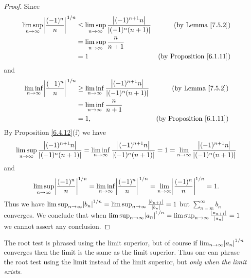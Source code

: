 \begin{proof}
    Since
    \begin{align*}
        \limsup_{n \to \infty} \abs{\frac{(-1)^n}{n}}^{1 / n} & \leq \limsup_{n \to \infty} \frac{\abs{(-1)^{n + 1} n}}{\abs{(-1)^n (n + 1)}} & \text{(by Lemma \ref{7.5.2})}        \\
                                                              & = \limsup_{n \to \infty} \frac{n}{n + 1}                                                                             \\
                                                              & = 1                                                                           & \text{(by Proposition \ref{6.1.11})}
    \end{align*}
    and
    \begin{align*}
        \liminf_{n \to \infty} \abs{\frac{(-1)^n}{n}}^{1 / n} & \geq \liminf_{n \to \infty} \frac{\abs{(-1)^{n + 1} n}}{\abs{(-1)^n (n + 1)}} & \text{(by Lemma \ref{7.5.2})}        \\
                                                              & = \liminf_{n \to \infty} \frac{n}{n + 1}                                                                             \\
                                                              & = 1,                                                                          & \text{(by Proposition \ref{6.1.11})}
    \end{align*}
    By Proposition \ref{6.4.12}(f) we have
    \[
        \limsup_{n \to \infty} \frac{\left\lvert(-1)^{n + 1} n\right\rvert}{\left\lvert(-1)^n (n + 1)\right\rvert} = \liminf_{n \to \infty} \frac{\left\lvert(-1)^{n + 1} n\right\rvert}{\left\lvert(-1)^n (n + 1)\right\rvert} = 1 = \lim_{n \to \infty} \frac{\left\lvert(-1)^{n + 1} n\right\rvert}{\left\lvert(-1)^n (n + 1)\right\rvert}
    \]
    and
    \[
        \limsup_{n \to \infty} \abs{\frac{(-1)^n}{n}}^{1 / n} = \liminf_{n \to \infty} \abs{\frac{(-1)^n}{n}}^{1 / n} = \lim_{n \to \infty} \abs{\frac{(-1)^n}{n}}^{1 / n} = 1.
    \]
    Thus we have \(\limsup_{n \to \infty} \abs{b_n}^{1 / n} = \limsup_{n \to \infty} \frac{\abs{b_{n + 1}}}{\abs{b_n}} = 1\) but \(\sum_{n = m}^\infty b_n\) converges.
    We conclude that when \(\limsup_{n \to \infty} \abs{a_n}^{1 / n} = \limsup_{n \to \infty} \frac{\abs{a_{n + 1}}}{\abs{a_n}} = 1\) we cannot assert any conclusion.
\end{proof}

\begin{note}
    The root test is phrased using the limit superior, but of course if \(\lim_{n \to \infty} \abs{a_n}^{1 / n}\) converges then the limit is the same as the limit superior.
    Thus one can phrase the root test using the limit instead of the limit superior, but \emph{only when the limit exists}.
\end{note}

